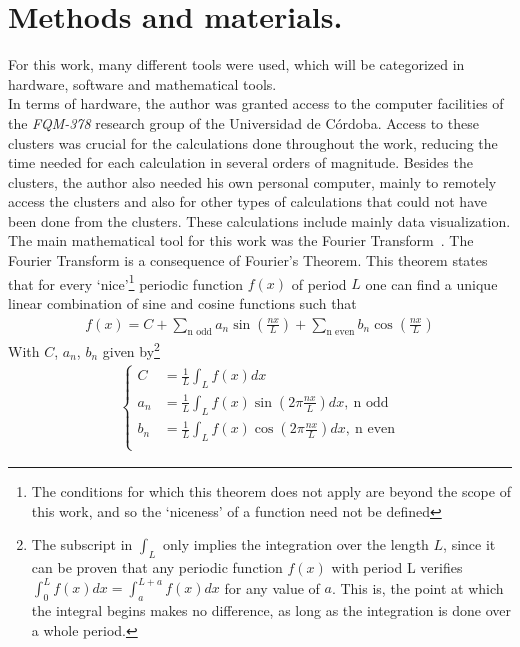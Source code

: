 \chapter{Methods and materials.}
\label{cha:met-mat}

For this work, many different tools were used, which will be categorized in hardware, software and mathematical tools. \\

In terms of hardware, the author was granted access to the computer facilities of the  \textit{FQM-378} research group of the Universidad de Córdoba. Access to these clusters was crucial for the calculations done throughout the work, reducing the time needed for each calculation in several orders of magnitude. Besides the clusters, the author also needed his own personal computer, mainly to remotely access the clusters and also for other types of calculations that could not have been done from the clusters. These calculations include mainly data visualization.  \\

The main mathematical tool for this work was the Fourier Transform~\cite{FFT}. The Fourier Transform is a consequence of Fourier's Theorem. This theorem states that for every `nice'\footnote{The conditions for which this theorem does not apply are beyond the scope of this work, and so the `niceness' of a function need not be defined} periodic function $f(x)$ of period $L$ one can find a unique linear combination of sine and cosine functions such that 
\begin{align}
	f(x) = C + \sum_\text{n odd} a_n \sin\left( \frac{nx}{L} \right) + \sum_{\text{n even}}^{} b_n \cos \left( \frac{nx}{L} \right) 
\end{align}
With $C $, $a_n$, $b_n$ given by\footnote{The subscript in $\int_{L}^{} $ only implies the integration over the length $L$, since it can be proven that any periodic function $f(x)$ with period L verifies $ \int_{0}^{L} f(x)dx = \int_{a}^{L+a} f(x)dx $ for any value of $a$. This is, the point at which the integral begins makes no difference, as long as the integration is done over a whole period. }
\begin{align}
	\begin{cases}
		C &= \frac{1}{L} \int_{L}^{} f(x) dx\\
		a_n &= \frac{1}{L} \int_{L}^{} f(x) \sin\left(  2\pi \frac{nx}{L} \right) dx,~\text{n odd}\\
		b_n &= \frac{1}{L} \int_{L}^{} f(x) \cos\left(  2\pi \frac{nx}{L} \right) dx,~\text{n even}\\
	\end{cases}
\end{align}

